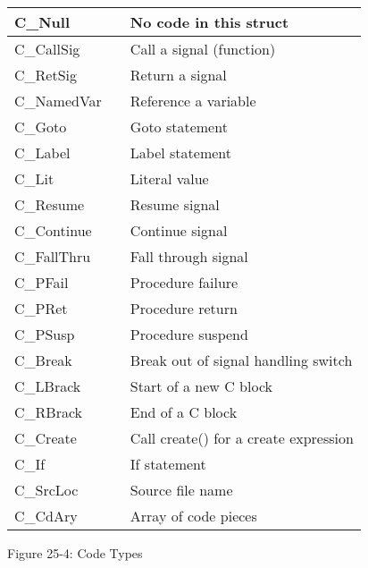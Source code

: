 \begin{center}
\tabletail{}
\tablelasttail{}
\begin{supertabular}{|m{0.9906598in}|m{0.42545983in}|m{2.42956in}|}
\hline
{\ttfamily C\_Null} &
 &
 No code in this struct\\\hline
{\ttfamily C\_CallSig} &
 &
 Call a signal (function)\\\hline
 C\_RetSig &
 &
 Return a signal\\\hline
 C\_NamedVar &
 &
 Reference a variable\\\hline
 C\_Goto &
 &
 Goto statement\\\hline
 C\_Label &
 &
 Label statement\\\hline
 C\_Lit &
 &
 Literal value\\\hline
 C\_Resume &
 &
 Resume signal\\\hline
 C\_Continue &
 &
 Continue signal\\\hline
 C\_FallThru &
 &
 Fall through signal\\\hline
 C\_PFail &
 &
 Procedure failure\\\hline
 C\_PRet &
 &
 Procedure return\\\hline
 C\_PSusp &
 &
 Procedure suspend\\\hline
 C\_Break &
 &
 Break out of signal handling switch\\\hline
 C\_LBrack &
 &
 Start of a new C block\\\hline
 C\_RBrack &
 &
 End of a C block\\\hline
 C\_Create &
 &
 Call create() for a create expression\\\hline
 C\_If &
 &
 If statement\\\hline
 C\_SrcLoc &
 &
 Source file name\\\hline
 C\_CdAry &
 &
 Array of code pieces\\\hline
\end{supertabular}
\end{center}
{\centering{}
Figure 25-4: Code Types
\par}


